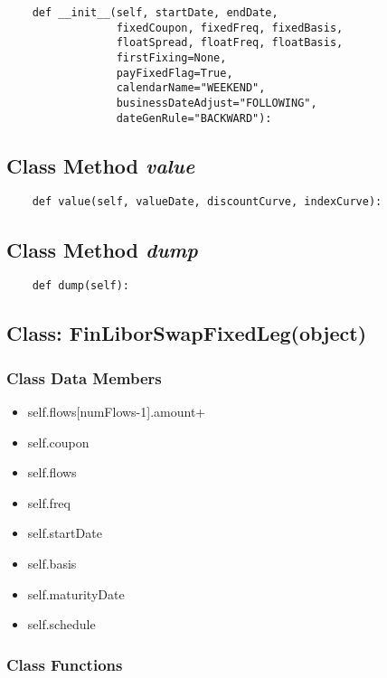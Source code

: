 \documentclass[twoside,11pt]{book}
\begin{document}
\begin{lstlisting}
    def __init__(self, startDate, endDate,
                 fixedCoupon, fixedFreq, fixedBasis,
                 floatSpread, floatFreq, floatBasis,
                 firstFixing=None,
                 payFixedFlag=True,
                 calendarName="WEEKEND",
                 businessDateAdjust="FOLLOWING",
                 dateGenRule="BACKWARD"):
\end{lstlisting}

\subsection{Class Method {\it value}}


\begin{lstlisting}
    def value(self, valueDate, discountCurve, indexCurve):
\end{lstlisting}

\subsection{Class Method {\it dump}}


\begin{lstlisting}
    def dump(self):
\end{lstlisting}

\subsection{Class: FinLiborSwapFixedLeg(object)}


\subsubsection{Class Data Members}
\begin{itemize}
\item{self.flows[numFlows-1].amount+}
\item{self.coupon}
\item{self.flows}
\item{self.freq}
\item{self.startDate}
\item{self.basis}
\item{self.maturityDate}
\item{self.schedule}
\end{itemize}

\subsubsection{Class Functions}
\end{document}
